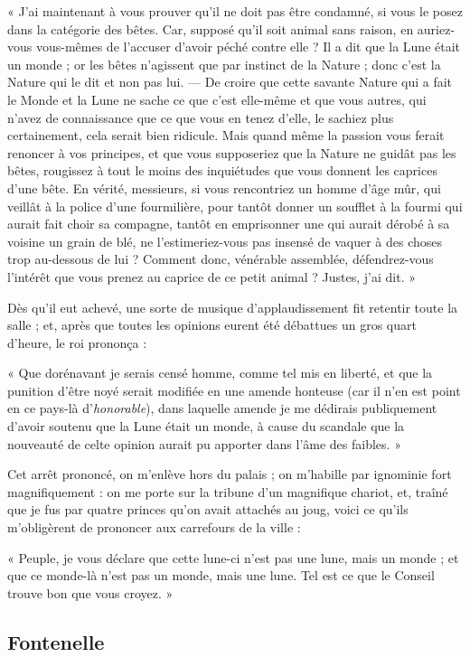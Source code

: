 \documentclass[a4paper, 11pt, oneside, landscape]{article}
\begin{document}
« J'ai maintenant à vous prouver qu'il ne doit pas être condamné, si vous le posez dans la catégorie des bêtes. Car, supposé qu'il soit animal sans raison, en auriez-vous vous-mêmes de l'accuser d'avoir péché contre elle ? Il a dit que la Lune était un monde ; or les bêtes n'agissent que par instinct de la Nature ; donc c'est la Nature qui le dit et non pas lui. --- De croire que cette savante Nature qui a fait le Monde et la Lune ne sache ce que c'est elle-même et que vous autres, qui n'avez de connaissance que ce que vous en tenez d'elle, le sachiez plus certainement, cela serait bien ridicule. Mais quand même la passion vous ferait renoncer à vos principes, et que vous supposeriez que la Nature ne guidât pas les bêtes, rougissez à tout le moins des inquiétudes que vous donnent les caprices d'une bête. En vérité, messieurs, si vous rencontriez un homme d'âge mûr, qui veillât à la police d'une fourmilière, pour tantôt donner un soufflet à la fourmi qui aurait fait choir sa compagne, tantôt en emprisonner une qui aurait dérobé à sa voisine un grain de blé, ne l'estimeriez-vous pas insensé de vaquer à des choses trop au-dessous de lui ? Comment donc, vénérable assemblée, défendrez-vous l'intérêt que vous prenez au caprice de ce petit animal ? Justes, j'ai dit. »

Dès qu'il eut achevé, une sorte de musique d'applaudissement fit retentir toute la salle ; et, après que toutes les opinions eurent été débattues un gros quart d'heure, le roi prononça :

« Que dorénavant je serais censé homme, comme tel mis en liberté, et que la punition d'être noyé serait modifiée en une amende honteuse (car il n'en est point en ce pays-là d'\emph{honorable}), dans laquelle amende je me dédirais publiquement d'avoir soutenu que la Lune était un monde, à cause du scandale que la nouveauté de celte opinion aurait pu apporter dans l'âme des faibles. »

Cet arrêt prononcé, on m'enlève hors du palais ; on m'habille par ignominie fort magnifiquement : on me porte sur la tribune d'un magnifique chariot, et, traîné que je fus par quatre princes qu'on avait attachés au joug, voici ce qu'ils m'obligèrent de prononcer aux carrefours de la ville :

« Peuple, je vous déclare que cette lune-ci n'est pas une lune, mais un monde ; et que ce monde-là n'est pas un monde, mais une lune. Tel est ce que le Conseil trouve bon que vous croyez. »
\clearpage
\subsection{Fontenelle}
\end{document}
